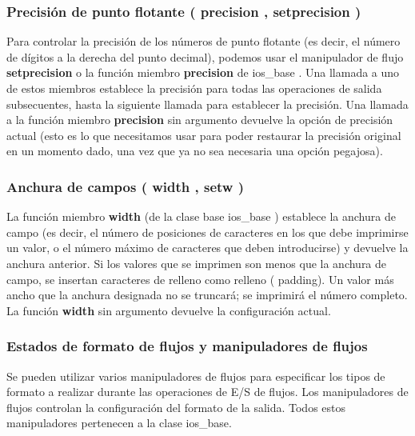 \subsubsection{Precisión de punto flotante ( precision , setprecision )}

Para controlar la precisión de los números de punto flotante (es decir, el número de dígitos a la derecha del punto
decimal), podemos usar el manipulador de flujo \textbf{setprecision} o la función miembro \textbf{precision} de ios\_base . Una
llamada a uno de estos miembros establece la precisión para todas las operaciones de salida subsecuentes, hasta la siguiente llamada para establecer la precisión. Una llamada a la función miembro \textbf{precision} sin argumento devuelve la opción
de precisión actual (esto es lo que necesitamos usar para poder restaurar la precisión original en un momento dado, una
vez que ya no sea necesaria una opción pegajosa).

\subsubsection{Anchura de campos ( width , setw )}

La función miembro \textbf{width} (de la clase base ios\_base ) establece la anchura de campo (es decir, el número de posiciones
de caracteres en los que debe imprimirse un valor, o el número máximo de caracteres que deben introducirse) y devuelve
la anchura anterior. Si los valores que se imprimen son menos que la anchura de campo, se insertan caracteres de relleno
como relleno ( padding). Un valor más ancho que la anchura designada no se truncará; se imprimirá el número completo.
La función \textbf{width} sin argumento devuelve la configuración actual.

\subsubsection{Estados de formato de flujos y manipuladores de flujos}

Se pueden utilizar varios manipuladores de flujos para especificar los tipos de formato a realizar durante las operaciones
de E/S de flujos. Los manipuladores de flujos controlan la configuración del formato de la salida. Todos estos manipuladores pertenecen a
la clase ios\_base.

